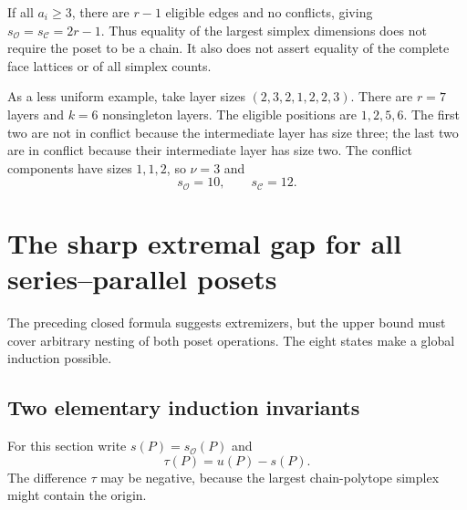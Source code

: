\documentclass[11pt]{article}
\theoremstyle{definition}
\newcommand{\OO}{\mathcal O}
\newcommand{\CC}{\mathcal C}
\newcommand{\sO}{s_{\OO}}
\newcommand{\sC}{s_{\CC}}
\begin{document}
If all $a_i\ge3$, there are $r-1$ eligible edges and no conflicts, giving $\sO=\sC=2r-1$. Thus equality of the largest simplex dimensions does not require the poset to be a chain. It also does not assert equality of the complete face lattices or of all simplex counts.

As a less uniform example, take layer sizes $(2,3,2,1,2,2,3)$. There are $r=7$ layers and $k=6$ nonsingleton layers. The eligible positions are $1,2,5,6$. The first two are not in conflict because the intermediate layer has size three; the last two are in conflict because their intermediate layer has size two. The conflict components have sizes $1,1,2$, so $\nu=3$ and
\[
\sO=10,\qquad \sC=12.
\]

\section{The sharp extremal gap for all series--parallel posets}\label{sec:gap}

The preceding closed formula suggests extremizers, but the upper bound must cover arbitrary nesting of both poset operations. The eight states make a global induction possible.

\subsection{Two elementary induction invariants}
For this section write $s(P)=\sO(P)$ and
\[
\tau(P)=u(P)-s(P).
\]
The difference $\tau$ may be negative, because the largest chain-polytope simplex might contain the origin.
\end{document}
